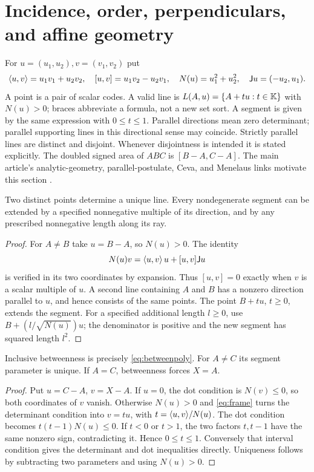 \section{Incidence, order, perpendiculars, and affine geometry}
\label{sec:affine}
For $u=(u_1,u_2),v=(v_1,v_2)$ put
\[
 \langle u,v\rangle=u_1v_1+u_2v_2,\quad [u,v]=u_1v_2-u_2v_1,
 \quad N(u)=u_1^2+u_2^2,\quad \mathsf J u=(-u_2,u_1).
\]
A point is a pair of scalar codes. A valid line is $L(A,u)=\{A+tu:t\in\mathbb K\}$
with $N(u)>0$; braces abbreviate a formula, not a new set sort.
A segment is given by the same expression with $0\le t\le1$.
Parallel directions mean zero determinant; parallel supporting lines in
this directional sense may coincide. Strictly parallel lines are distinct
and disjoint. Whenever disjointness is intended it is stated explicitly.
The doubled signed area of $ABC$ is $[B-A,C-A]$.
The main article's analytic-geometry, parallel-postulate, Ceva, and
Menelaus links motivate this section \cite{wiki,euclid}.

\begin{theorem}\label{aff:line}
Two distinct points determine a unique line. Every nondegenerate segment can be extended
by a specified nonnegative multiple of its direction, and by any prescribed
nonnegative length along its ray.
\end{theorem}
\begin{proof}
For $A\ne B$ take $u=B-A$, so $N(u)>0$. The identity
\begin{equation}\label{eq:frame}
 N(u)v=\langle u,v\rangle\,u+[u,v]\mathsf J u
\end{equation}
is verified in its two coordinates by expansion. Thus $[u,v]=0$ exactly
when $v$ is a scalar multiple of $u$. A second line containing $A$ and
$B$ has a nonzero direction parallel to $u$, and hence consists of the
same points. The point $B+tu$, $t\ge0$, extends the segment. For a
specified additional length $l\ge0$, use $B+(l/\sqrt{N(u)})u$;
the denominator is positive and the new segment has squared length $l^2$.
\end{proof}

\begin{theorem}
\label{aff:between}
Inclusive betweenness is precisely \eqref{eq:betweenpoly}. For $A\ne C$
its segment parameter is unique. If $A=C$, betweenness forces $X=A$.
\end{theorem}
\begin{proof}
Put $u=C-A$, $v=X-A$. If $u=0$, the dot condition is $N(v)\le0$,
so both coordinates of $v$ vanish. Otherwise $N(u)>0$ and
\eqref{eq:frame} turns the determinant condition into $v=tu$, with
$t=\langle u,v\rangle/N(u)$. The dot condition becomes $t(t-1)N(u)\le0$.
If $t<0$ or $t>1$, the two factors $t,t-1$ have the same nonzero sign,
contradicting it. Hence $0\le t\le1$. Conversely that interval condition
gives the determinant and dot inequalities directly. Uniqueness follows
by subtracting two parameters and using $N(u)>0$.
\end{proof}


